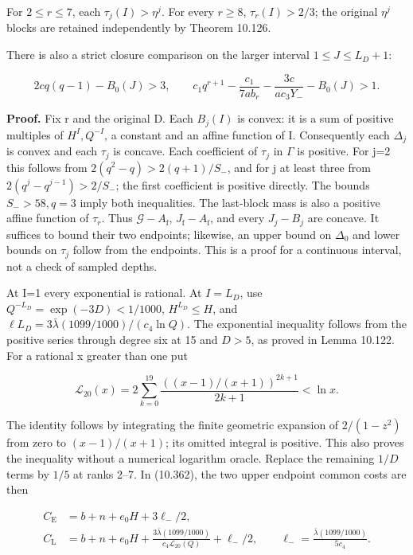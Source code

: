 \documentclass[
  11pt,
  a4paper,
]{article}
\begin{document}
For \(2\le r\le7\), each \(\tau_j(I)>\eta^j\). For every \(r\ge8\),
\(\tau_r(I)>2/3\); the original \(\eta^j\) blocks are retained
independently by Theorem 10.126.

There is also a strict closure comparison on the larger interval
\(1\le J\le L_D+1\):

\[
2cq(q-1)-B_0(J)>3,\qquad
c_1q^{r+1}-\frac{c_1}{7ab_r}
-\frac{3c}{ac_3Y_-}-B_0(J)>1.
\tag{10.369}
\]

\textbf{Proof.} Fix r and the original D. Each \(B_j(I)\) is convex: it
is a sum of positive multiples of \(H^I,Q^{-I}\), a constant and an
affine function of I. Consequently each \(\Delta_j\) is convex and each
\(\tau_j\) is concave. Each coefficient of \(\tau_j\) in \(\Gamma\) is
positive. For j=2 this follows from \(2(q^2-q)>2(q+1)/S_-\), and for j
at least three from \(2(q^j-q^{j-1})>2/S_-\); the first coefficient is
positive directly. The bounds \(S_->58,q=3\) imply both inequalities.
The last-block mass is also a positive affine function of \(\tau_r\).
Thus \(\mathcal G-A_{\mathrm f}\), \(J_{\mathrm f}-A_{\mathrm f}\), and
every \(J_j-B_j\) are concave. It suffices to bound their two endpoints;
likewise, an upper bound on \(\Delta_0\) and lower bounds on \(\tau_j\)
follow from the endpoints. This is a proof for a continuous interval,
not a check of sampled depths.

At I=1 every exponential is rational. At \(I=L_D\), use
\(Q^{-L_D}=\exp(-3D)<1/1000\), \(H^{L_D}\le H\), and
\(\ell L_D=3\bar\lambda(1099/1000)/(c_4\ln Q)\). The exponential
inequality follows from the positive series through degree six at 15 and
\(D>5\), as proved in Lemma 10.122. For a rational x greater than one
put

\[
\mathcal L_{20}(x)=2\sum_{k=0}^{19}
\frac{((x-1)/(x+1))^{2k+1}}{2k+1}<\ln x.
\tag{10.370}
\]

The identity follows by integrating the finite geometric expansion of
\(2/(1-z^2)\) from zero to \((x-1)/(x+1)\); its omitted integral is
positive. This also proves the inequality without a numerical logarithm
oracle. Replace the remaining \(1/D\) terms by \(1/5\) at ranks 2--7. In
(10.362), the two upper endpoint common costs are then

\[
\begin{aligned}
C_{\mathrm E}&=b+n+e_0H+3\ell_-/2,\\
C_{\mathrm L}&=b+n+e_0H+
\frac{3\bar\lambda(1099/1000)}{c_4\mathcal L_{20}(Q)}+\ell_-/2,
\qquad \ell_-=\frac{\bar\lambda(1099/1000)}{5c_4}.
\end{aligned}
\tag{10.371}
\]
\end{document}
